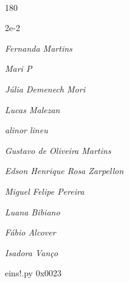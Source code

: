 \documentclass[12pt]{article}
\begin{document}
\pagebreak			

	\ 
	\vfill
	\begin{turn}{180}	
		\begin{minipage}{\textwidth}
		  	\ttfamily %
			\centering
			{\Huge 2e-2}
		  
			\hfill
		  
			

\textit{\small Fernanda Martins}

\textit{\small Mari P}

\textit{\small Júlia Demenech Mori}

\textit{\small Lucas Malezan}

\textit{\small alinor lineu}

\textit{\small Gustavo de Oliveira Martins}

\textit{\small Edson Henrique Rosa Zarpellon}

\textit{\small Miguel Felipe Pereira}

\textit{\small Luana Bibiano}

\textit{\small Fábio Alcover}

\textit{\small Isadora Vanço}

\bigskip

eins!.py
0x0023


		\end{minipage}	
	\end{turn}
	\vfill
	\

\pagebreak
\end{document}
